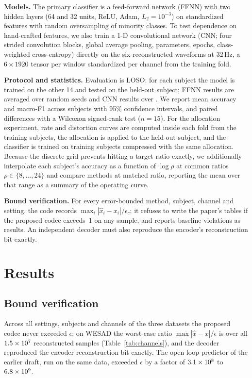 \documentclass[journal]{IEEEtran}
\begin{document}
\textbf{Models.} The primary classifier is a feed-forward network (FFNN) with two hidden layers (64 and 32 units, ReLU, Adam, $L_2=10^{-3}$) on standardized features with random oversampling of minority classes. To test dependence on hand-crafted features, we also train a 1-D convolutional network (CNN; four strided convolution blocks, global average pooling, \cnnNParams{} parameters, \cnnEpochs{} epochs, class-weighted cross-entropy) directly on the six reconstructed waveforms at 32\,Hz, a $6\times1920$ tensor per window standardized per channel from the training fold.

\textbf{Protocol and statistics.} Evaluation is LOSO: for each subject the model is trained on the other 14 and tested on the held-out subject; FFNN results are averaged over \nSeeds{} random seeds and CNN results over \cnnNSeeds. We report mean accuracy and macro-F1 across subjects with 95\% confidence intervals, and paired differences with a Wilcoxon signed-rank test ($n=15$). For the allocation experiment, rate and distortion curves are computed inside each fold from the training subjects, the allocation is applied to the held-out subject, and the classifier is trained on training subjects compressed with the same allocation. Because the discrete grid prevents hitting a target ratio exactly, we additionally interpolate each subject's accuracy as a function of $\log\rho$ at common ratios $\rho\in\{8,\dots,24\}$ and compare methods at matched ratio, reporting the mean over that range as a summary of the operating curve.

\textbf{Bound verification.} For every error-bounded method, subject, channel and setting, the code records $\max_i|\hat{x}_i-x_i|/\epsilon_c$; it refuses to write the paper's tables if the proposed codec exceeds~1 on any sample, and reports baseline violations as results. An independent decoder must also reproduce the encoder's reconstruction bit-exactly.

\section{Results}
\label{sec:results}
\subsection{Bound verification}
\label{sec:verif}
Across all settings, subjects and channels of the three datasets the proposed codec never exceeded $\epsilon$; on WESAD the worst-case ratio $\max|\hat{x}-x|/\epsilon$ is \maxErrRatioAll{} over all $1.5\times10^{7}$ reconstructed samples (Table~\ref{tab:channels}), and the decoder reproduced the encoder reconstruction bit-exactly. The open-loop predictor of the earlier draft, run on the same data, exceeded $\epsilon$ by a factor of $3.1\times10^{8}$ to $6.8\times10^{9}$.
\end{document}
